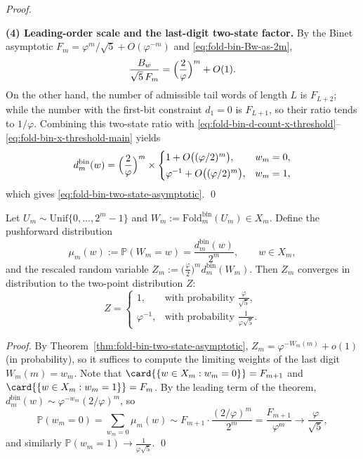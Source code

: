 \begin{proof}
\begin{equation}
\end{equation}
\par
\noindent\textbf{(4) Leading-order scale and the last-digit two-state factor.}
By the Binet asymptotic \(F_m=\varphi^m/\sqrt5+O(\varphi^{-m})\) and \eqref{eq:fold-bin-Bw-as-2m},
\begin{equation}\label{eq:fold-bin-x-threshold-main}
\frac{B_w}{\sqrt5\,F_m}=\Bigl(\frac{2}{\varphi}\Bigr)^m+O(1).
\end{equation}
On the other hand, the number of admissible tail words of length \(L\) is \(F_{L+2}\);
while the number with the first-bit constraint \(d_1=0\) is \(F_{L+1}\), so their ratio tends to \(1/\varphi\).
Combining this two-state ratio with \eqref{eq:fold-bin-d-count-x-threshold}--\eqref{eq:fold-bin-x-threshold-main} yields
\[
d^{\mathrm{bin}}_m(w)
=\Bigl(\frac{2}{\varphi}\Bigr)^m\times
\begin{cases}
1+O\bigl((\varphi/2)^m\bigr),& w_m=0,\\[2pt]
\varphi^{-1}+O\bigl((\varphi/2)^m\bigr),& w_m=1,
\end{cases}
\]
which gives \eqref{eq:fold-bin-two-state-asymptotic}. \qed
\end{proof}

\begin{corollary}\label{cor:fold-bin-two-point-limit-law}
Let \(U_m\sim\mathrm{Unif}\{0,\dots,2^m-1\}\) and \(W_m:=\mathrm{Fold}^{\mathrm{bin}}_m(U_m)\in X_m\).
Define the pushforward distribution
\[
\mu_m(w):=\mathbb{P}(W_m=w)=\frac{d^{\mathrm{bin}}_m(w)}{2^m},\qquad w\in X_m,
\]
and the rescaled random variable
\(
Z_m:=\bigl(\frac{\varphi}{2}\bigr)^m d^{\mathrm{bin}}_m(W_m)
\).
Then \(Z_m\) converges in distribution to the two-point distribution \(Z\):
\[
Z=
\begin{cases}
1,& \text{with probability }\displaystyle \frac{\varphi}{\sqrt5},\\[6pt]
\varphi^{-1},& \text{with probability }\displaystyle \frac{1}{\varphi\sqrt5}.
\end{cases}
\]
\end{corollary}

\begin{proof}
By Theorem~\ref{thm:fold-bin-two-state-asymptotic}, \(Z_m=\varphi^{-W_m(m)}+o(1)\) (in probability), so it suffices to compute the limiting weights of the last digit \(W_m(m)=w_m\).
Note that \(\card{\{w\in X_m:w_m=0\}}=F_{m+1}\) and \(\card{\{w\in X_m:w_m=1\}}=F_m\).
By the leading term of the theorem, \(d^{\mathrm{bin}}_m(w)\sim \varphi^{-w_m}(2/\varphi)^m\), so
\[
\mathbb{P}(w_m=0)
=\sum_{w_m=0}\mu_m(w)
\sim
F_{m+1}\cdot \frac{(2/\varphi)^m}{2^m}
=\frac{F_{m+1}}{\varphi^m}\to \frac{\varphi}{\sqrt5},
\]
and similarly \(\mathbb{P}(w_m=1)\to \frac{1}{\varphi\sqrt5}\). \qed
\end{proof}

